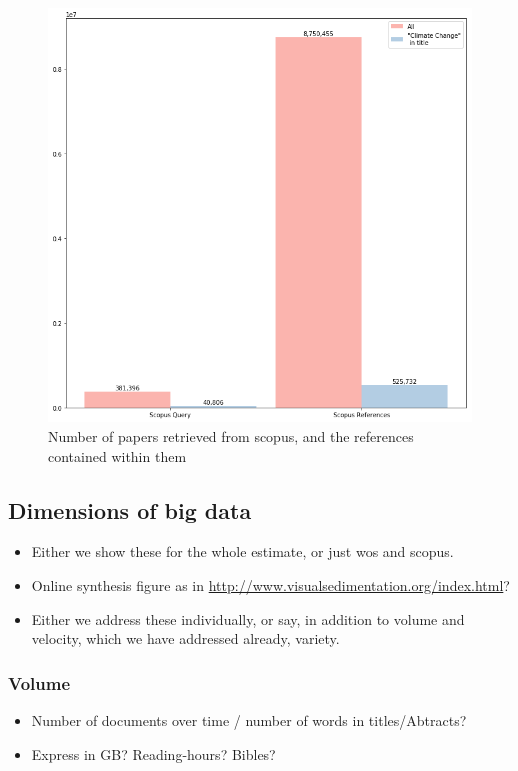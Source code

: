 \documentclass{article}
\begin{document}
\begin{figure}
\includegraphics[width=\linewidth]{plots/scopus_docs_refs}
\caption{Number of papers retrieved from scopus, and the references contained within them}
\end{figure}


% 
% 

\subsection{Dimensions of big data}
\begin{itemize}
	\item Either we show these for the whole estimate, or just wos and scopus.	
    \item Online synthesis figure as in \url{http://www.visualsedimentation.org/index.html}?
    \item Either we address these individually, or say, in addition to volume and velocity, which we have addressed already, variety.
\end{itemize}

\subsubsection*{Volume}
\begin{itemize}
	\item Number of documents over time / number of words in titles/Abtracts?
    \item Express in GB? Reading-hours? Bibles? 
\end{itemize}
\end{document}
